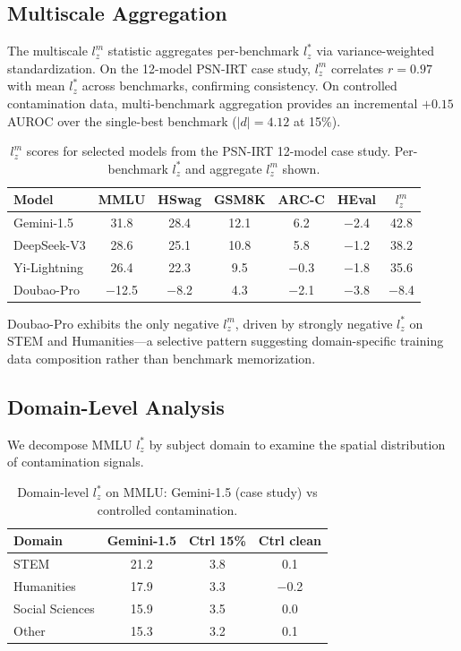 \documentclass[11pt,a4paper]{article}
\newcommand{\lzstar}{$l_{z}^{*}$}
\newcommand{\lzm}{$l_{z}^{m}$}
\begin{document}
\subsection{Multiscale Aggregation}
\label{sec:lzm}

The multiscale \lzm{} statistic aggregates per-benchmark \lzstar{} via variance-weighted standardization.
On the 12-model PSN-IRT case study, \lzm{} correlates $r = 0.97$ with mean \lzstar{} across benchmarks, confirming consistency.
On controlled contamination data, multi-benchmark aggregation provides an incremental $+0.15$ AUROC over the single-best benchmark ($|d| = 4.12$ at 15\%).

\begin{table}[h]
\centering
\small
\caption{\lzm{} scores for selected models from the PSN-IRT 12-model case study. Per-benchmark \lzstar{} and aggregate \lzm{} shown.}
\label{tab:lzm}
\begin{tabular}{lcccccc}
\toprule
\textbf{Model} & \textbf{MMLU} & \textbf{HSwag} & \textbf{GSM8K} & \textbf{ARC-C} & \textbf{HEval} & $l_z^m$ \\
\midrule
Gemini-1.5 & 31.8 & 28.4 & 12.1 & 6.2 & $-$2.4 & 42.8 \\
DeepSeek-V3 & 28.6 & 25.1 & 10.8 & 5.8 & $-$1.2 & 38.2 \\
Yi-Lightning & 26.4 & 22.3 & 9.5 & $-$0.3 & $-$1.8 & 35.6 \\
Doubao-Pro & $-$12.5 & $-$8.2 & 4.3 & $-$2.1 & $-$3.8 & $-$8.4 \\
\bottomrule
\end{tabular}
\end{table}

Doubao-Pro exhibits the only negative \lzm{}, driven by strongly negative \lzstar{} on STEM and Humanities---a selective pattern suggesting domain-specific training data composition rather than benchmark memorization.

\subsection{Domain-Level Analysis}
\label{sec:domain}

We decompose MMLU \lzstar{} by subject domain to examine the spatial distribution of contamination signals.

\begin{table}[h]
\centering
\small
\caption{Domain-level \lzstar{} on MMLU: Gemini-1.5 (case study) vs controlled contamination.}
\label{tab:domain}
\begin{tabular}{lccc}
\toprule
\textbf{Domain} & \textbf{Gemini-1.5} & \textbf{Ctrl 15\%} & \textbf{Ctrl clean} \\
\midrule
STEM & 21.2 & 3.8 & 0.1 \\
Humanities & 17.9 & 3.3 & $-$0.2 \\
Social Sciences & 15.9 & 3.5 & 0.0 \\
Other & 15.3 & 3.2 & 0.1 \\
\bottomrule
\end{tabular}
\end{table}
\end{document}
